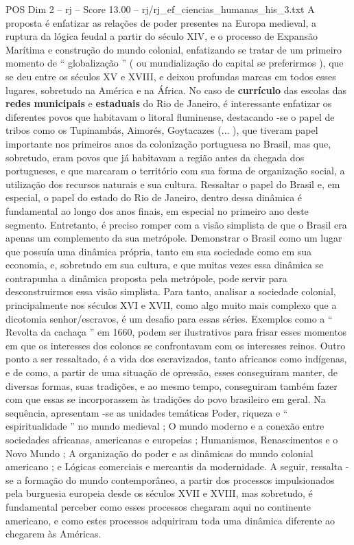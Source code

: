 \begin{textsample}{POS Dim 2 – rj – Score 13.00 – rj/rj\_ef\_ciencias\_humanas\_his\_3.txt}
A proposta é enfatizar as relações de poder presentes na Europa medieval, a ruptura da lógica feudal a partir do século XIV, e o processo de Expansão Marítima e construção do mundo colonial, enfatizando se tratar de um primeiro momento de “ globalização ” ( ou mundialização do capital se preferirmos ), que se deu entre os séculos XV e XVIII, e deixou profundas marcas em todos esses lugares, sobretudo na América e na África.
No caso de \textbf{currículo} das escolas das \textbf{redes} \textbf{municipais} e \textbf{estaduais} do Rio de Janeiro, é interessante enfatizar os diferentes povos que habitavam o litoral fluminense, destacando -se o papel de tribos como os Tupinambás, Aimorés, Goytacazes (... ), que tiveram papel importante nos primeiros anos da colonização portuguesa no Brasil, mas que, sobretudo, eram povos que já habitavam a região antes da chegada dos portugueses, e que marcaram o território com sua forma de organização social, a utilização dos recursos naturais e sua cultura.
Ressaltar o papel do Brasil e, em especial, o papel do estado do Rio de Janeiro, dentro dessa dinâmica é fundamental ao longo dos anos finais, em especial no primeiro ano deste segmento.
Entretanto, é preciso romper com a visão simplista de que o Brasil era apenas um complemento da sua metrópole.
Demonstrar o Brasil como um lugar que possuía uma dinâmica própria, tanto em sua sociedade como em sua economia, e, sobretudo em sua cultura, e que muitas vezes essa dinâmica se contrapunha a dinâmica proposta pela metrópole, pode servir para desconstruirmos essa visão simplista.
Para tanto, analisar a sociedade colonial, principalmente nos séculos XVI e XVII, como algo muito mais complexo que a dicotomia senhor/escravos, é um desafio para essas séries.
Exemplos como a “ Revolta da cachaça ” em 1660, podem ser ilustrativos para frisar esses momentos em que os interesses dos colonos se confrontavam com os interesses reinos.
Outro ponto a ser ressaltado, é a vida dos escravizados, tanto africanos como indígenas, e de como, a partir de uma situação de opressão, esses conseguiram manter, de diversas formas, suas tradições, e ao mesmo tempo, conseguiram também fazer com que essas se incorporassem às tradições do povo brasileiro em geral.
Na sequência, apresentam -se as unidades temáticas Poder, riqueza e “ espiritualidade ” no mundo medieval ; O mundo moderno e a conexão entre sociedades africanas, americanas e europeias ; Humanismos, Renascimentos e o Novo Mundo ; A organização do poder e as dinâmicas do mundo colonial americano ; e Lógicas comerciais e mercantis da modernidade.
A seguir, ressalta -se a formação do mundo contemporâneo, a partir dos processos impulsionados pela burguesia europeia desde os séculos XVII e XVIII, mas sobretudo, é fundamental perceber como esses processos chegaram aqui no continente americano, e como estes processos adquiriram toda uma dinâmica diferente ao chegarem às Américas.

\end{textsample}
